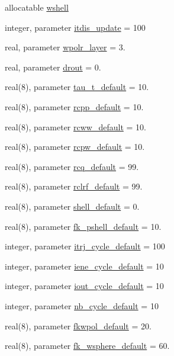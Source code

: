 \begin{DoxyCompactItemize}
allocatable \hyperlink{classmd_a10ddccddacedb6f3a62458f2222eb70f}{wshell}
\item 
integer, parameter \hyperlink{classmd_ad498808cf85ba9aaa23e36d14cd848e6}{itdis\-\_\-update} = 100
\item 
real, parameter \hyperlink{classmd_a2b1061412b67a4928eba17cba519bf1f}{wpolr\-\_\-layer} = 3.
\item 
real, parameter \hyperlink{classmd_a2e56e27ddda05d3aba1f2b0e7642dc2b}{drout} = 0.
\item 
real(8), parameter \hyperlink{classmd_abbe077dab38ac32d051ad4fb08428f1c}{tau\-\_\-t\-\_\-default} = 10.
\item 
real(8), parameter \hyperlink{classmd_afdf8c43cdabafd853a977f75f528cbe4}{rcpp\-\_\-default} = 10.
\item 
real(8), parameter \hyperlink{classmd_a2f872843dc2ee5af7a22d0e7e7314118}{rcww\-\_\-default} = 10.
\item 
real(8), parameter \hyperlink{classmd_aacf31a06d22b560d5bd1fd8aaa25f4e8}{rcpw\-\_\-default} = 10.
\item 
real(8), parameter \hyperlink{classmd_ad865c88f84f85d3271c93b4667804f27}{rcq\-\_\-default} = 99.
\item 
real(8), parameter \hyperlink{classmd_a45dc4987c51010b053ea23a1cdc62894}{rclrf\-\_\-default} = 99.
\item 
real(8), parameter \hyperlink{classmd_ac5881b079c82e5b0859142a83ee22b37}{shell\-\_\-default} = 0.
\item 
real(8), parameter \hyperlink{classmd_a6f457c47b2d922765588fbac87e2a4e1}{fk\-\_\-pshell\-\_\-default} = 10.
\item 
integer, parameter \hyperlink{classmd_a1bb5d4a2cb75b8acccea5794f0a58aa6}{itrj\-\_\-cycle\-\_\-default} = 100
\item 
integer, parameter \hyperlink{classmd_af8c218348f086868b6add7ccec168b29}{iene\-\_\-cycle\-\_\-default} = 10
\item 
integer, parameter \hyperlink{classmd_af488caf19eab51ce8ce832996e1fa672}{iout\-\_\-cycle\-\_\-default} = 10
\item 
integer, parameter \hyperlink{classmd_a3a5bbab59418bb873317f301c5948a40}{nb\-\_\-cycle\-\_\-default} = 10
\item 
real(8), parameter \hyperlink{classmd_ae9e782c19e7636346e18a19c7e4b4589}{fkwpol\-\_\-default} = 20.
\item 
real(8), parameter \hyperlink{classmd_a42a51ca3bf54461c029d7f016faad723}{fk\-\_\-wsphere\-\_\-default} = 60.
\item 

\end{DoxyCompactItemize}
